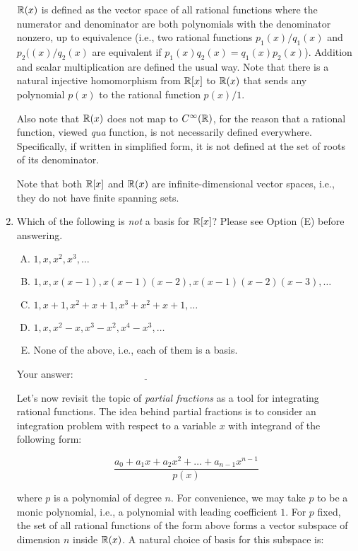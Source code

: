 \documentclass[10pt]{amsart}
\begin{document}
\begin{enumerate}
  $\mathbb{R}(x)$ is defined as the vector space of all rational functions
  where the numerator and denominator are both polynomials with the
  denominator nonzero, up to equivalence (i.e., two rational functions
  $p_1(x)/q_1(x)$ and $p_2((x)/q_2(x)$ are equivalent if $p_1(x)q_2(x)
  = q_1(x)p_2(x)$). Addition and scalar multiplication are defined the
  usual way. Note that there is a natural injective homomorphism from
  $\mathbb{R}[x]$ to $\mathbb{R}(x)$ that sends any polynomial $p(x)$ to the rational
  function $p(x)/1$.

  Also note that $\mathbb{R}(x)$ does not map to $C^\infty(\mathbb{R})$, for the
  reason that a rational function, viewed {\em qua} function, is not
  necessarily defined everywhere. Specifically, if written in
  simplified form, it is not defined at the set of roots of its
  denominator.

  Note that both $\mathbb{R}[x]$ and $\mathbb{R}(x)$ are infinite-dimensional vector
  spaces, i.e., they do not have finite spanning sets.

\item Which of the following is {\em not} a basis for $\mathbb{R}[x]$? Please
  see Option (E) before answering.

  \begin{enumerate}[(A)]
  \item $1,x,x^2,x^3,\dots$
  \item $1,x,x(x - 1),x(x - 1)(x - 2),x(x-1)(x-2)(x-3),\dots$
  \item $1,x + 1, x^2 + x + 1, x^3 + x^2 + x + 1, \dots$
  \item $1,x,x^2 - x, x^3 - x^2, x^4 - x^3,\dots$
  \item None of the above, i.e., each of them is a basis.
  \end{enumerate}

  \vspace{0.1in}
  Your answer: $\underline{\qquad\qquad\qquad\qquad\qquad\qquad\qquad}$
  \vspace{0.1in}

  Let's now revisit the topic of {\em partial fractions} as a tool for
  integrating rational functions. The idea behind partial fractions is
  to consider an integration problem with respect to a variable
  $x$ with integrand of the following form:

  $$\frac{a_0 + a_1x + a_2x^2 + \dots + a_{n-1}x^{n-1}}{p(x)}$$

  where $p$ is a polynomial of degree $n$. For convenience, we may
  take $p$ to be a monic polynomial, i.e., a polynomial with leading
  coefficient $1$. For $p$ fixed, the set of all rational functions of
  the form above forms a vector subspace of dimension $n$ inside
  $\mathbb{R}(x)$. A natural choice of basis for this subspace is:


\end{enumerate}
\end{document}

